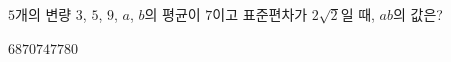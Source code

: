$5$개의 변량 $3$, $5$, $9$, $a$, $b$의 평균이 $7$이고 표준편차가 $2\sqrt{2}$일 때, $ab$의 값은?
\begin{choices32}{$68$}{$70$}{$74$}{$77$}{$80$}\end{choices32}
